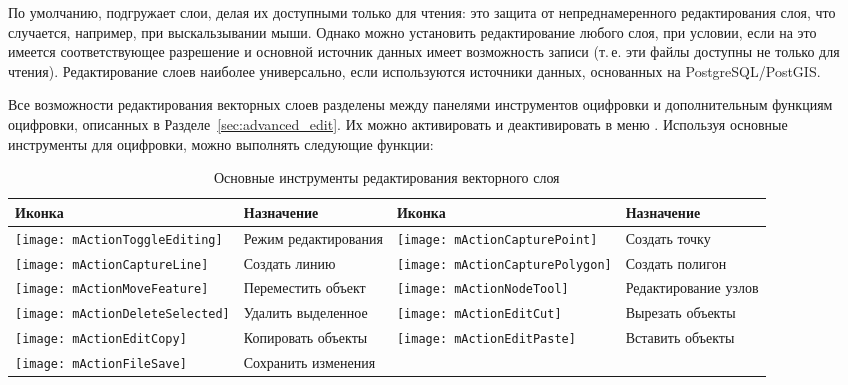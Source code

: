 По умолчанию, \qg подгружает слои, делая их доступными только для чтения:
это защита от непреднамеренного редактирования слоя, что случается, например,
при выскальзывании мыши. Однако можно установить редактирование любого слоя,
при условии, если на это имеется соответствующее разрешение и основной
источник данных имеет возможность записи (т.\,е. эти файлы доступны не только
для чтения). Редактирование слоев наиболее универсально, если используются
источники данных, основанных на PostgreSQL/PostGIS.

Все возможности редактирования векторных слоев разделены между панелями
инструментов оцифровки и дополнительным функциям оцифровки, описанных в
Разделе~\ref{sec:advanced_edit}. Их можно активировать и деактивировать
в меню  \arrow {}.
Используя основные инструменты для оцифровки, можно выполнять следующие
функции:

\begin{table}[ht]
\centering
\begin{tabular}{|l|p{5.5cm}|l|p{5.5cm}|}
\hline \textbf{Иконка} & \textbf{Назначение} & \textbf{Иконка} & \textbf{Назначение} \\
\hline \texttt{[image: mActionToggleEditing]}
   & Режим редактирования
   & \texttt{[image: mActionCapturePoint]}
   & Создать точку \\
\hline \texttt{[image: mActionCaptureLine]}
   & Создать линию
   & \texttt{[image: mActionCapturePolygon]}
   & Создать полигон \\
\hline \texttt{[image: mActionMoveFeature]}
   & Переместить объект
   & \texttt{[image: mActionNodeTool]}
   & Редактирование узлов \\
\hline \texttt{[image: mActionDeleteSelected]}
   & Удалить выделенное
   & \texttt{[image: mActionEditCut]}
   & Вырезать объекты \\
\hline \texttt{[image: mActionEditCopy]}
   & Копировать объекты
   & \texttt{[image: mActionEditPaste]}
   & Вставить объекты \\
\hline \texttt{[image: mActionFileSave]}
   & Сохранить изменения
   &  &  \\
\hline
\end{tabular}
\caption{Основные инструменты редактирования векторного слоя}\label{tab:vector_editing}\medskip
\end{table}

